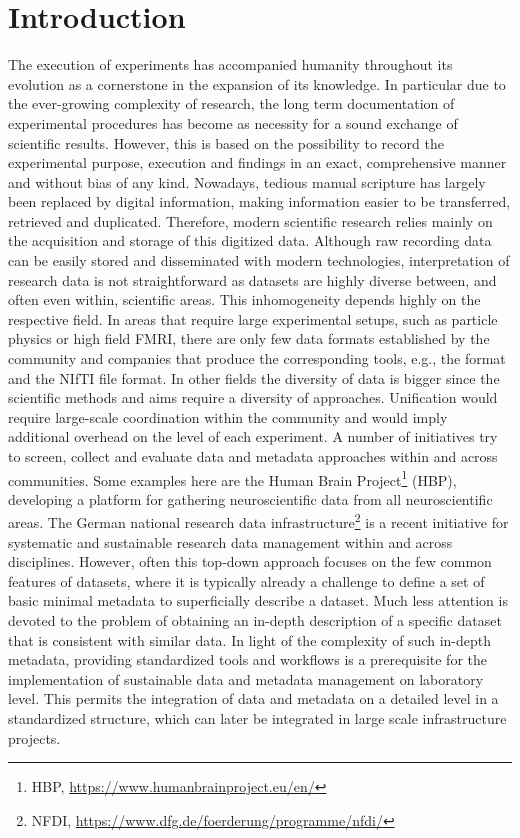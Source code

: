 \clearpage
\chapter{Introduction}
\label{sec:intro}
The execution of experiments has accompanied humanity throughout its evolution as a cornerstone in the expansion of its knowledge. In particular due to the ever-growing complexity of research, the long term documentation of experimental procedures has become as necessity for a sound exchange of scientific results. However, this is based on the possibility to record the experimental purpose, execution and findings in an exact, comprehensive manner and without bias of any kind. Nowadays, tedious manual scripture has largely been replaced by digital information, making information easier to be transferred, retrieved and duplicated. Therefore, modern scientific research relies mainly on the acquisition and storage of this digitized data. Although raw recording data can be easily stored and disseminated with modern technologies, interpretation of research data is not straightforward as datasets are highly diverse between, and often even within, scientific areas. This inhomogeneity depends highly on the respective field. In areas that require large experimental setups, such as particle physics or high field FMRI, there are only few data formats established by the community and companies that produce the corresponding tools, e.g., the  format \citep{Brun_1996} and the NIfTI file format. In other fields the diversity of data is bigger since the scientific methods and aims require a diversity of approaches. Unification would require large-scale coordination within the community and  would imply additional overhead on the level of each experiment. A number of initiatives try to screen, collect and evaluate data and metadata approaches within and across communities. Some examples here are the Human Brain Project\footnote{HBP, \url{https://www.humanbrainproject.eu/en/}} (HBP), developing a platform for gathering neuroscientific data from all neuroscientific areas. The German national research data infrastructure\footnote{NFDI, \url{https://www.dfg.de/foerderung/programme/nfdi/}} is a recent initiative for systematic and sustainable research data management within and across disciplines. However, often this top-down approach focuses on the few common features of datasets, where it is typically already a challenge to define a set of basic minimal metadata to superficially describe a dataset. Much less attention is devoted to the problem of obtaining an in-depth description of a specific dataset that is consistent with similar data. In light of the complexity of such in-depth metadata, providing standardized tools and workflows is a prerequisite for the implementation of sustainable data and metadata management on laboratory level. This permits the integration of data and metadata on a detailed level in a standardized structure, which can later be integrated in large scale infrastructure projects.\\

